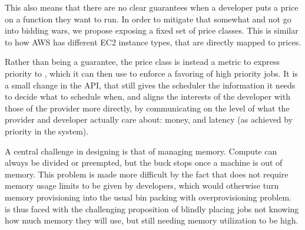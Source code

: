 This also means that there are no clear guarantees when a developer puts a price
on a function they want to run. In order to mitigate that somewhat and not go
into bidding wars, we propose exposing a fixed set of price classes. This is
similar to how AWS has different EC2 instance types, that are directly mapped to
prices. 

Rather than being a guarantee, the price class is instead a metric to express
priority to \sys{}, which it can then use to enforce a favoring of high priority
jobs. It is a small change in the API, that still gives the scheduler the
information it needs to decide what to schedule when, and aligns the interests
of the developer with those of the provider more directly, by communicating on
the level of what the provider and developer actually care about: money, and
latency (as achieved by priority in the system).

A central challenge in designing \sys{} is that of managing memory. Compute can
always be divided or preempted, but the buck stops once a machine is out of
memory. This problem is made more difficult by the fact that \sys{} does not
require memory usage limits to be given by developers, which would otherwise
turn memory provisioning into the usual bin packing with overprovisioning
problem.~\Sys{} is thus faced with the challenging proposition of blindly
placing jobs not knowing how much memory they will use, but still needing memory
utilization to be high.



 
